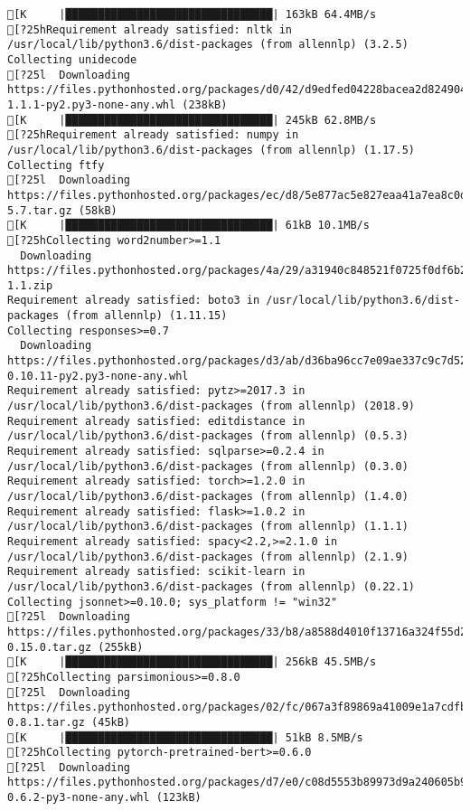 \documentclass[
]{article}
\begin{document}
\begin{verbatim}
[K     |████████████████████████████████| 163kB 64.4MB/s 
[?25hRequirement already satisfied: nltk in /usr/local/lib/python3.6/dist-packages (from allennlp) (3.2.5)
Collecting unidecode
[?25l  Downloading https://files.pythonhosted.org/packages/d0/42/d9edfed04228bacea2d824904cae367ee9efd05e6cce7ceaaedd0b0ad964/Unidecode-1.1.1-py2.py3-none-any.whl (238kB)
[K     |████████████████████████████████| 245kB 62.8MB/s 
[?25hRequirement already satisfied: numpy in /usr/local/lib/python3.6/dist-packages (from allennlp) (1.17.5)
Collecting ftfy
[?25l  Downloading https://files.pythonhosted.org/packages/ec/d8/5e877ac5e827eaa41a7ea8c0dc1d3042e05d7e337604dc2aedb854e7b500/ftfy-5.7.tar.gz (58kB)
[K     |████████████████████████████████| 61kB 10.1MB/s 
[?25hCollecting word2number>=1.1
  Downloading https://files.pythonhosted.org/packages/4a/29/a31940c848521f0725f0df6b25dca8917f13a2025b0e8fcbe5d0457e45e6/word2number-1.1.zip
Requirement already satisfied: boto3 in /usr/local/lib/python3.6/dist-packages (from allennlp) (1.11.15)
Collecting responses>=0.7
  Downloading https://files.pythonhosted.org/packages/d3/ab/d36ba96cc7e09ae337c9c7d52ab1cdce769802ff39a0295cce42ddaa5103/responses-0.10.11-py2.py3-none-any.whl
Requirement already satisfied: pytz>=2017.3 in /usr/local/lib/python3.6/dist-packages (from allennlp) (2018.9)
Requirement already satisfied: editdistance in /usr/local/lib/python3.6/dist-packages (from allennlp) (0.5.3)
Requirement already satisfied: sqlparse>=0.2.4 in /usr/local/lib/python3.6/dist-packages (from allennlp) (0.3.0)
Requirement already satisfied: torch>=1.2.0 in /usr/local/lib/python3.6/dist-packages (from allennlp) (1.4.0)
Requirement already satisfied: flask>=1.0.2 in /usr/local/lib/python3.6/dist-packages (from allennlp) (1.1.1)
Requirement already satisfied: spacy<2.2,>=2.1.0 in /usr/local/lib/python3.6/dist-packages (from allennlp) (2.1.9)
Requirement already satisfied: scikit-learn in /usr/local/lib/python3.6/dist-packages (from allennlp) (0.22.1)
Collecting jsonnet>=0.10.0; sys_platform != "win32"
[?25l  Downloading https://files.pythonhosted.org/packages/33/b8/a8588d4010f13716a324f55d23999259bad9db2320f4fe919a66b2f651f3/jsonnet-0.15.0.tar.gz (255kB)
[K     |████████████████████████████████| 256kB 45.5MB/s 
[?25hCollecting parsimonious>=0.8.0
[?25l  Downloading https://files.pythonhosted.org/packages/02/fc/067a3f89869a41009e1a7cdfb14725f8ddd246f30f63c645e8ef8a1c56f4/parsimonious-0.8.1.tar.gz (45kB)
[K     |████████████████████████████████| 51kB 8.5MB/s 
[?25hCollecting pytorch-pretrained-bert>=0.6.0
[?25l  Downloading https://files.pythonhosted.org/packages/d7/e0/c08d5553b89973d9a240605b9c12404bcf8227590de62bae27acbcfe076b/pytorch_pretrained_bert-0.6.2-py3-none-any.whl (123kB)

\end{verbatim}
\end{document}
